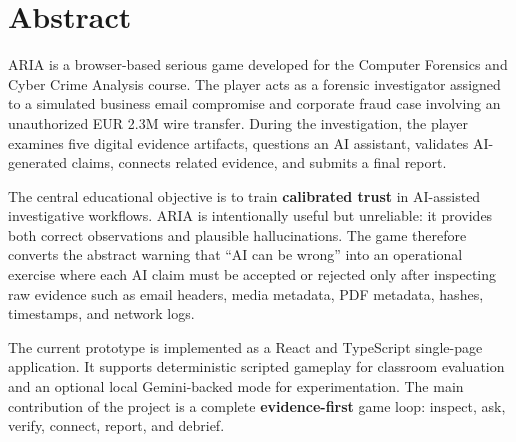 \chapter*{Abstract}

ARIA is a browser-based serious game developed for the Computer Forensics and Cyber Crime Analysis course. The player acts as a forensic investigator assigned to a simulated business email compromise and corporate fraud case involving an unauthorized EUR 2.3M wire transfer. During the investigation, the player examines five digital evidence artifacts, questions an AI assistant, validates AI-generated claims, connects related evidence, and submits a final report.

The central educational objective is to train \textbf{calibrated trust} in AI-assisted investigative workflows. ARIA is intentionally useful but unreliable: it provides both correct observations and plausible hallucinations. The game therefore converts the abstract warning that ``AI can be wrong'' into an operational exercise where each AI claim must be accepted or rejected only after inspecting raw evidence such as email headers, media metadata, PDF metadata, hashes, timestamps, and network logs.

The current prototype is implemented as a React and TypeScript single-page application. It supports deterministic scripted gameplay for classroom evaluation and an optional local Gemini-backed mode for experimentation. The main contribution of the project is a complete \textbf{evidence-first} game loop: inspect, ask, verify, connect, report, and debrief.
